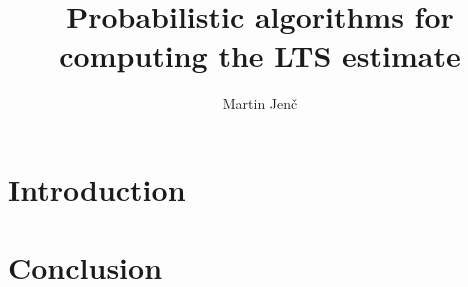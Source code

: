 \documentclass[thesis=B,english]{FITthesis}[2012/10/20]
\title{Probabilistic algorithms for computing the LTS estimate}
\author{Martin Jen{\v c}} %
\begin{document}





\chapter{Introduction}







\chapter{Conclusion}












\end{document}
